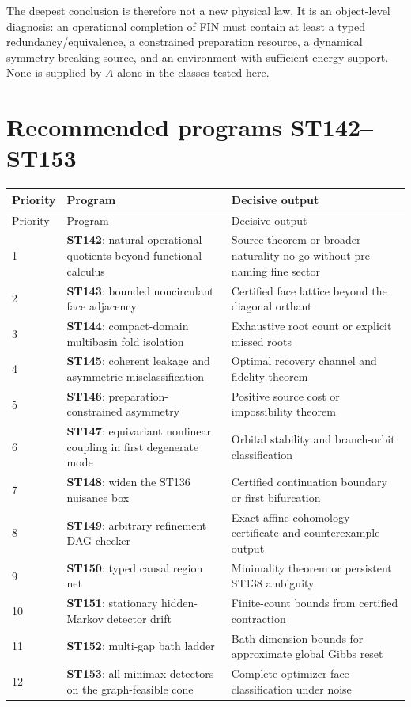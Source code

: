 \documentclass[11pt,a4paper]{article}
\begin{document}
The deepest conclusion is therefore not a new physical law. It is an object-level diagnosis: an operational completion of FIN must contain at least a typed redundancy/equivalence, a constrained preparation resource, a dynamical symmetry-breaking source, and an environment with sufficient energy support. None is supplied by $A$ alone in the classes tested here.

\section{Recommended programs ST142--ST153}
\small
\begin{longtable}{@{}p{}p{}p{}@{}}
\toprule Priority & Program & Decisive output\\\midrule\endfirsthead
\toprule Priority & Program & Decisive output\\\midrule\endhead
1 & \textbf{ST142}: natural operational quotients beyond functional calculus & Source theorem or broader naturality no-go without pre-naming fine sector\\
2 & \textbf{ST143}: bounded noncirculant face adjacency & Certified face lattice beyond the diagonal orthant\\
3 & \textbf{ST144}: compact-domain multibasin fold isolation & Exhaustive root count or explicit missed roots\\
4 & \textbf{ST145}: coherent leakage and asymmetric misclassification & Optimal recovery channel and fidelity theorem\\
5 & \textbf{ST146}: preparation-constrained asymmetry & Positive source cost or impossibility theorem\\
6 & \textbf{ST147}: equivariant nonlinear coupling in first degenerate mode & Orbital stability and branch-orbit classification\\
7 & \textbf{ST148}: widen the ST136 nuisance box & Certified continuation boundary or first bifurcation\\
8 & \textbf{ST149}: arbitrary refinement DAG checker & Exact affine-cohomology certificate and counterexample output\\
9 & \textbf{ST150}: typed causal region net & Minimality theorem or persistent ST138 ambiguity\\
10 & \textbf{ST151}: stationary hidden-Markov detector drift & Finite-count bounds from certified contraction\\
11 & \textbf{ST152}: multi-gap bath ladder & Bath-dimension bounds for approximate global Gibbs reset\\
12 & \textbf{ST153}: all minimax detectors on the graph-feasible cone & Complete optimizer-face classification under noise\\
\bottomrule
\end{longtable}
\normalsize
\end{document}
